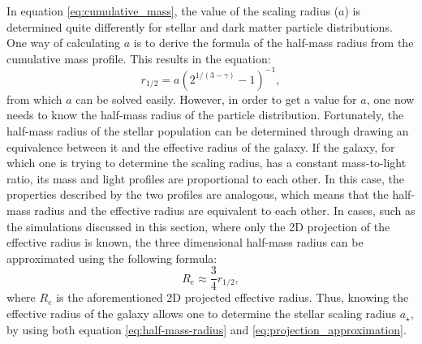 \documentclass[english, twoside]{HYgradu}
\begin{document}
In equation \ref{eq:cumulative_mass}, the value of the scaling radius ($a$) is determined quite differently for stellar and dark matter particle distributions. One way of calculating $a$ is to derive the formula of the half-mass radius from the cumulative mass profile. This results in the equation:
\begin{equation}
r_{1/2} = a \left( 2^{1/(3-\gamma)}-1 \right)^{-1}, \label{eq:half-mass-radius}
\end{equation}
from which $a$ can be solved easily. However, in order to get a value for $a$, one now needs to know the half-mass radius of the particle distribution. Fortunately, the half-mass radius of the stellar population can be determined through drawing an equivalence between it and the effective radius of the galaxy. If the galaxy, for which one is trying to determine the scaling radius, has a constant mass-to-light ratio, its mass and light profiles are proportional to each other. In this case, the properties described by the two profiles are analogous, which means that the half-mass radius and the effective radius are equivalent to each other. In cases, such as the simulations discussed in this section, where only the 2D projection of the effective radius is known, the three dimensional half-mass radius can be approximated using the following formula:
\begin{equation}
R_e \approx \frac{3}{4} r_{1/2}, \label{eq:projection_approximation}
\end{equation} 
where $R_e$ is the aforementioned 2D projected effective radius. Thus, knowing the effective radius of the galaxy allows one to determine the stellar scaling radius $a_\star$, by using both equation \ref{eq:half-mass-radius} and \ref{eq:projection_approximation}.
\end{document}
